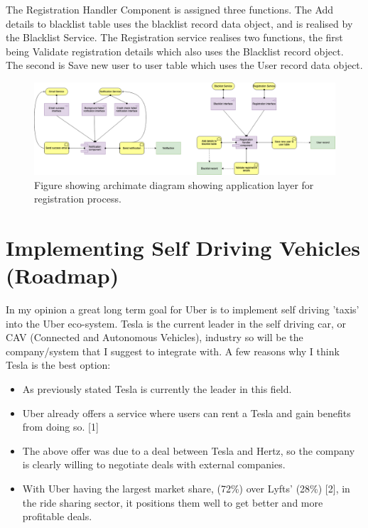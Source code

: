 \documentclass{article}
\begin{document}
    The Registration Handler Component is assigned three functions. The Add details to blacklist table uses the blacklist record data object,
    and is realised by the Blacklist Service. The Registration service realises two functions, the first being 
    Validate registration details which also uses the Blacklist record object. The second is Save new user to 
    user table which uses the User record data object.

    \begin{figure}[H]
      \centering
      \captionsetup{justification=centering}
      \includegraphics[width=12cm]{assets/arch_app.drawio.png}
      \caption{Figure showing archimate diagram showing application layer for registration process.}
      \label{fig:archimateAppLayer}
    \end{figure}

    \newpage

    \section{Implementing Self Driving Vehicles (Roadmap)}
    In my opinion a great long term goal for Uber is to implement self driving 'taxis' into the Uber eco-system. Tesla is the current leader
    in the self driving car, or CAV (Connected and Autonomous Vehicles), industry so will be the company/system that I suggest to 
    integrate with. A few reasons why I think Tesla is the best option:

    \begin{itemize}
      \item As previously stated Tesla is currently the leader in this field.
      \item Uber already offers a service where users can rent a Tesla and gain benefits from doing so. [1]
      \item The above offer was due to a deal between Tesla and Hertz, so the company is clearly willing to negotiate deals with external companies.
      \item With Uber having the largest market share, (72\%) over Lyfts' (28\%) [2], in the ride sharing sector, it positions them well to get better and more profitable deals.
    \end{itemize}
\end{document}
